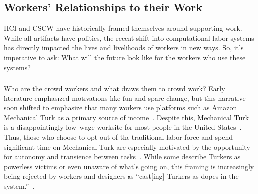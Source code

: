 \documentclass[trackingWork]{subfiles}
\begin{document}
\subsection[What will work and the place of work look like for workers]{Workers' Relationships to their Work}\label{sec:relationships}

HCI and CSCW have historically framed themselves around supporting work.
While all artifacts have politics,
the recent shift into computational labor systems has directly impacted
the lives and livelihoods of workers in new ways.
So, it's imperative to ask:
What will the future look like for the workers who use these systems?

\subsubsection{\crowdworkpers}
\begin{comment}
	- Workers do it for money
	- Workers coordinate and communicate (gray, being a turker, team stuff). there is mega--drama
	- Workers don't like requesters. have tried to organize
\end{comment}

Who are the crowd workers and what draws them to crowd work?
Early literature emphasized motivations like fun and spare change, but this narrative soon shifted to emphasize that many workers use platforms such as Amazon Mechanical Turk as a primary source of income~\cite{kaufmann2011more,ipeirotis2010demographics,Antin2012a}.
Despite this, Mechanical Turk is a disappointingly low--wage worksite for most people in the United States~\cite{ipeirotis2010demographics,martin2014being,gupta2014turk}.
Thus, those who choose to opt out of the traditional labor force and spend significant time on Mechanical Turk are especially motivated by the opportunity for autonomy and transience between tasks~\cite{kaufmann2011more}.
While some describe Turkers as powerless victims or even unaware of what's going on,
this framing is increasingly being rejected by workers and designers as
``cast[ing] Turkers as dopes in the system.''~\cite{storiesIraniSilberman}.
\end{document}
